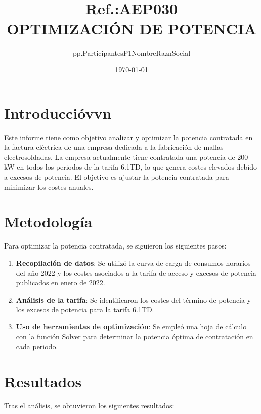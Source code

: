 \documentclass[a4paper,10pt,twocolumn]{article}
\title{{ \qrcode[height=1.3cm]{https://doctec.blog/} \\ \small Ref.:\uppercase{Aep030}}\\{\textbf{OPTIMIZACIÓN DE POTENCIA}}}
\author{
pp.ParticipantesP1NombreRaznSocial
}
\date{\today}
\begin{document}
\begin{Form}
	\maketitle

	\tableofcontents  %
	\listoffigures    %
	\listoftables     %



    









\section{Introduccióvvn}
Este informe tiene como objetivo analizar y optimizar la potencia contratada en la factura eléctrica de una empresa dedicada a la fabricación de mallas electrosoldadas. La empresa actualmente tiene contratada una potencia de 200 kW en todos los periodos de la tarifa 6.1TD, lo que genera costes elevados debido a excesos de potencia. El objetivo es ajustar la potencia contratada para minimizar los costes anuales.

\section{Metodología}
Para optimizar la potencia contratada, se siguieron los siguientes pasos:

\begin{enumerate}
    \item \textbf{Recopilación de datos}: Se utilizó la curva de carga de consumos horarios del año 2022 y los costes asociados a la tarifa de acceso y excesos de potencia publicados en enero de 2022.
    \item \textbf{Análisis de la tarifa}: Se identificaron los costes del término de potencia y los excesos de potencia para la tarifa 6.1TD.
    \item \textbf{Uso de herramientas de optimización}: Se empleó una hoja de cálculo con la función Solver para determinar la potencia óptima de contratación en cada periodo.
\end{enumerate}

\section{Resultados}
Tras el análisis, se obtuvieron los siguientes resultados:




\end{Form}
\end{document}

